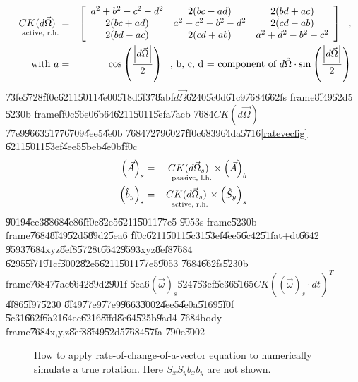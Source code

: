 \documentclass[12pt,a4paper]{article}
\begin{document}
\begin{eqnarray*}
\underset{\text{active, r.h.}}{CK(d\vec{\Omega})} &=&\left[ 
\begin{array}{ccc}
a^{2}+b^{2}-c^{2}-d^{2} & 2(bc-ad) & 2(bd+ac) \\ 
2(bc+ad) & a^{2}+c^{2}-b^{2}-d^{2} & 2(cd-ab) \\ 
2(bd-ac) & 2(cd+ab) & a^{2}+d^{2}-b^{2}-c^{2}%
\end{array}%
\right] \text{,} \\
\text{with }a &=&\cos \left( \frac{\left\vert d\vec{\Omega}\right\vert }{2}%
\right) \text{, b, c, d = component of }d\hat{\Omega}\cdot \sin \left( \frac{%
\left\vert d\vec{\Omega}\right\vert }{2}\right)
\end{eqnarray*}%
\U{73fe}\U{5728}\U{ff0c}\U{6211}\U{5011}\U{4e00}\U{518d}\U{5f37}\U{8abf}$d%
\vec{\Omega}$\U{6240}\U{5c0d}\U{61c9}\U{7684}\U{662f}s frame\U{8f49}\U{52d5}%
\U{5230}b frame\U{ff0c}\U{56e0}\U{6b64}\U{6211}\U{5011}\U{5efa}\U{7acb}%
\U{7684}$CK(d\vec{\Omega})$\U{77e9}\U{9663}\U{5177}\U{6709}\U{4ee5}\U{4e0b}%
\U{7684}\U{7279}\U{6027}\U{ff0c}\U{6839}\U{64da}\U{5716}\ref{ratevecfig}%
\U{6211}\U{5011}\U{53ef}\U{4ee5}\U{5beb}\U{4e0b}\U{ff0c}%
\begin{eqnarray}
\left( \vec{A}\right) _{s} &=&\underset{\text{passive, l.h.}}{CK(d\vec{\Omega%
}_{s})}\times \left( \vec{A}\right) _{b}  \label{frametrans} \\
\left( \hat{b}_{y}\right) _{s} &=&\underset{\text{active, r.h.}}{CK(d\vec{%
\Omega}_{s})}\times \left( \hat{S}_{y}\right) _{s}  \label{vecrot}
\end{eqnarray}%
\U{9019}\U{4ee3}\U{8868}\U{4e86}\U{ff0c}\U{82e5}\U{6211}\U{5011}\U{77e5}%
\U{9053}s frame\U{5230}b frame\U{7684}\U{8f49}\U{52d5}\U{89d2}\U{5ea6}%
\U{ff0c}\U{6211}\U{5011}\U{5c31}\U{53ef}\U{4ee5}\U{6c42}\U{51fa}t+dt\U{6642}%
\U{9593}\U{7684}xyz\U{8ef8}\U{5728}t\U{6642}\U{9593}xyz\U{8ef8}\U{7684}%
\U{6295}\U{5f71}\U{91cf}\U{3002}\U{82e5}\U{6211}\U{5011}\U{77e5}\U{9053}%
\U{7684}\U{662f}s\U{5230}b frame\U{7684}\U{77ac}\U{6642}\U{89d2}\U{901f}%
\U{5ea6}$\left( \vec{\omega}\right) _{s}$\U{5247}\U{53ef}\U{5e36}\U{5165}$%
CK(\left( \vec{\omega}\right) _{s}\cdot dt)^{T}$\U{4f86}\U{5f97}\U{5230}%
\U{8f49}\U{77e9}\U{77e9}\U{9663}\U{3002}\U{4ee5}\U{4e0a}\U{5169}\U{5f0f}%
\U{5c31}\U{662f}\U{6a21}\U{64ec}\U{6216}\U{8ffd}\U{8e64}\U{525b}\U{9ad4}%
\U{7684}body frame\U{7684}x,y,z\U{8ef8}\U{8f49}\U{52d5}\U{7684}\U{57fa}%
\U{790e}\U{3002}

\begin{figure}[th]
\caption{How to apply rate-of-change-of-a-vector equation to numerically
simulate a true rotation. Here $S_{x}S_{y}b_{x}b_{y}$ are not shown.}
\label{szsbtdtfig}
\begin{center}
\fbox{}
\end{center}
\end{figure}
\end{document}
